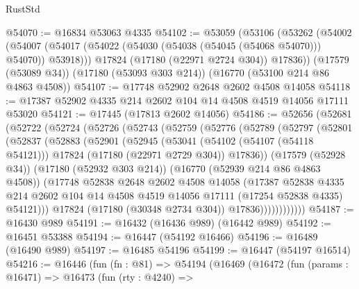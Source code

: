 \begin{lexlean}{RustStd}
\begin{coremodule}
@54070 := @16834 @53063 @4335
@54102 := @53059
    (@53106
      (@53262
        (@54002 (@54007 (@54017 (@54022 (@54030 (@54038 (@54045 (@54068 @54070))) @54070)) @53918)))
        @17824
        (@17180 (@22971 @2724 @304))
        @17836))
    (@17579 (@53089 @34))
    (@17180 (@53093 @303 @214))
    (@16770 (@53100 @214 @86 @4863 @4508))
@54107 := @17748 @52902 @2648 @2602 @4508 @14058
@54118 := @17387 @52902 @4335 @214 @2602 @104 @14 @4508 @4519 @14056 @17111 @53020
@54121 := @17445 (@17813 @2602 @14056)
@54186 := @52656
    (@52681
      (@52722
        (@52724
          (@52726
            (@52743
              (@52759
                (@52776
                  (@52789
                    (@52797
                      (@52801
                        (@52837
                          (@52883
                            (@52901
                              (@52945
                                (@53041
                                  (@54102 (@54107 (@54118 @54121)))
                                  @17824
                                  (@17180 (@22971 @2729 @304))
                                  @17836))
                              (@17579 (@52928 @34))
                              (@17180 (@52932 @303 @214))
                              (@16770 (@52939 @214 @86 @4863 @4508))
                              (@17748
                                @52838
                                @2648
                                @2602
                                @4508
                                @14058
                                (@17387
                                  @52838
                                  @4335
                                  @214
                                  @2602
                                  @104
                                  @14
                                  @4508
                                  @4519
                                  @14056
                                  @17111
                                  (@17254 @52838 @4335)
                                  @54121)))
                            @17824
                            (@17180 (@30348 @2734 @304))
                            @17836))))))))))))
@54187 := @16430 @989
@54191 := @16432 (@16436 @989) (@16442 @989)
@54192 := @16451 @53388
@54194 := @16447 (@54192 @16466)
@54196 := @16489 (@16490 @989)
@54197 := @16485 @54196
@54199 := @16447 (@54197 @16514)
@54216 := @16446
    (fun (fn : @81) =>
    @54194
      (@16469
        (@16472
          (fun (params : @16471) =>
          @16473
            (fun (rty : @4240) =>

\end{coremodule}
\end{lexlean}
